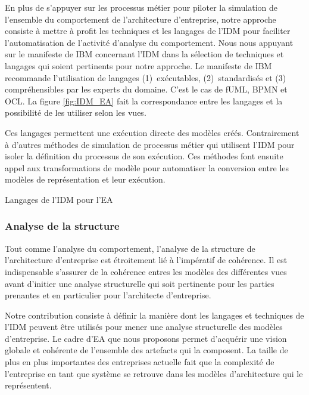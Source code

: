 En plus de s'appuyer sur les processus métier pour piloter la simulation de
l'ensemble du comportement de l'architecture d'entreprise, notre approche
consiste à mettre à profit les techniques et les langages de l'IDM pour
faciliter l'automatisation de l'activité d'analyse du comportement. Nous nous
appuyant sur le manifeste de IBM \cite{chesbrough2006research} concernant l'IDM
dans la sélection de techniques et langages qui soient pertinents pour notre
approche. Le manifeste de IBM recommande l'utilisation de langages
(1)~exécutables, (2)~standardisés et (3) compréhensibles par les experts du
domaine. C'est le cas de fUML, BPMN et OCL. La figure \ref{fig:IDM_EA} fait la
correspondance entre les langages et la possibilité de les utiliser selon les
vues.


Ces langages permettent une exécution directe des modèles créés. Contrairement à
d'autres méthodes de simulation de processus métier qui utilisent l'IDM pour
isoler la définition du processus de son exécution. Ces méthodes font ensuite
appel aux transformations de modèle pour automatiser la conversion entre les
modèles de représentation et leur exécution.

\begin{table}[!ht]
    \begin{center}
        
    \end{center}
    \caption{Langages de l'IDM pour l'EA}
    \label{fig:IDM_EA}
\end{table}

        \subsubsection{Analyse de la structure}
Tout comme l'analyse du comportement,
l'analyse de la structure de l'architecture d'entreprise est étroitement lié à
l'impératif de cohérence. Il est indispensable s'assurer de la cohérence
entres les modèles des différentes vues avant d'initier une analyse
structurelle qui soit pertinente pour les parties prenantes et en particulier
pour l'architecte d'entreprise.

Notre contribution consiste à définir la manière dont les langages et techniques
de l'IDM peuvent être utilisés pour mener une analyse structurelle des modèles
d'entreprise. Le cadre d'EA que nous proposons permet d'acquérir une vision
globale et cohérente de l'ensemble des artefacts qui la composent. La taille de
plus en plus importantes des entreprises actuelle fait que la complexité de
l'entreprise en tant que système se retrouve dans les modèles d'architecture qui
le représentent.

